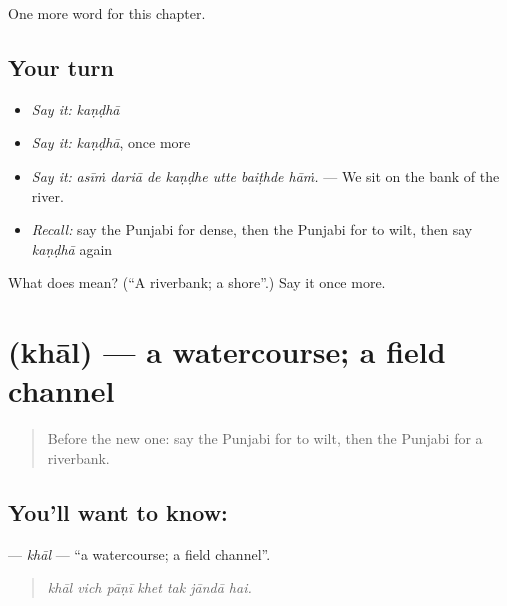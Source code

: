\begin{grammarlens}[title={What you've built}]
One more word for this chapter.
\end{grammarlens}

\subsection*{Your turn}
\begin{itemize}
\raggedright
  \item \emph{Say it:} \emph{kaṇḍhā}
  \item \emph{Say it:} \emph{kaṇḍhā}, once more
  \item \emph{Say it:} \emph{asīṁ dariā de kaṇḍhe utte baiṭhde hāṁ.} — We sit on the bank of the river.
  \item \emph{Recall:} say the Punjabi for dense, then the Punjabi for to wilt, then say \emph{kaṇḍhā} again
\end{itemize}

\begin{tcolorbox}[breakable,colback=teal!4,colframe=teal!35!black,title={Before you move on}]
What does  mean? (\textquotedblleft{}A riverbank; a shore\textquotedblright{}.) Say it once more.
\end{tcolorbox}
\section[\texorpdfstring{\pa{ਖਾਲ} (khāl)}{ਖਾਲ (khāl)}]{ (khāl) — a watercourse; a field channel}

\label{lesson:PA-C299-khal}



\begin{quote}
Before the new one: say the Punjabi for to wilt, then the Punjabi for a riverbank.
\end{quote}

\subsection*{You'll want to know: }
\textbf{} — \emph{khāl} — \textquotedblleft{}a watercourse; a field channel\textquotedblright{}.

\begin{quote}
      
\end{quote}

\begin{quote}
\emph{khāl vich pāṇī khet tak jāndā hai.}
\end{quote}

